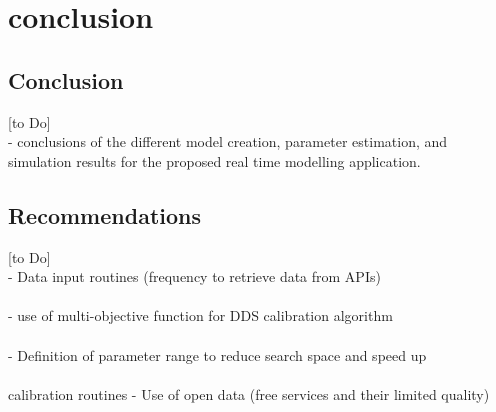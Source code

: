 \chapter{conclusion}

\section{Conclusion}
[to Do] \\

\noindent- conclusions of the different model creation, parameter estimation, and simulation results for the proposed real time modelling application.\\

\section{Recommendations}
[to Do]\\

\noindent- Data input routines (frequency to retrieve data from APIs)\\ \\
- use of multi-objective function for DDS calibration algorithm\\ \\
- Definition of parameter range to reduce search space and speed up\\ \\ calibration routines
- Use of open data (free services and their limited quality)\\ \\










